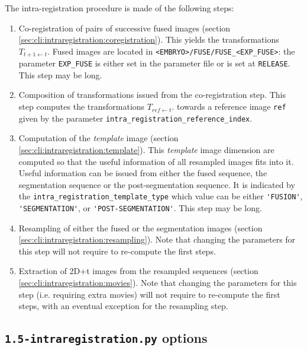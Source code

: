 The intra-registration procedure is made of the following steps:
\begin{enumerate}
\itemsep -1ex
\item \label{it:intrareg:co:register} Co-registration of pairs of successive fused images (section
  \ref{sec:cli:intraregistration:coregistration}). This yields the
  transformations $T_{t+1 \leftarrow t}$. Fused images are located in
  \verb|<EMBRYO>/FUSE/FUSE_<EXP_FUSE>|: the parameter \verb|EXP_FUSE|
  is either set in the parameter file or is set at
  \verb|RELEASE|. This step may be long. 

\item Composition of transformations issued from the co-registration
  step. This step computes the transformations $T_{ref \leftarrow
    t}$. towards a reference image \verb|ref| given by the parameter
  \verb|intra_registration_reference_index|. 

\item \label{it:intrareg:co:template} Computation of the \textit{template} image (section
  \ref{sec:cli:intraregistration:template}). This \textit{template}
  image dimension are computed so that the useful information of all
  resampled images fits into it. Useful information can be issued from
  either the fused sequence, the segmentation sequence or the
  post-segmentation sequence. It is indicated by the
  \verb|intra_registration_template_type| which value can be either
  \verb|'FUSION'|,  \verb|'SEGMENTATION'|, or
  \verb|'POST-SEGMENTATION'|. This step may be long. 

\item \label{it:intrareg:co:resampling}
  Resampling of either the fused or the segmentation images
  (section \ref{sec:cli:intraregistration:resampling}). Note that
  changing the parameters for this step will not require to re-compute
  the first steps. 

\item \label{it:intrareg:co:movies}
  Extraction of 2D+t images from the resampled sequences (section
  \ref{sec:cli:intraregistration:movies}). Note that changing the
  parameters for this step (i.e. requiring extra movies) will not
  require to re-compute the first steps, with an eventual exception
  for the resampling step. 

\end{enumerate}



\subsection{\texttt{1.5-intraregistration.py} options}

